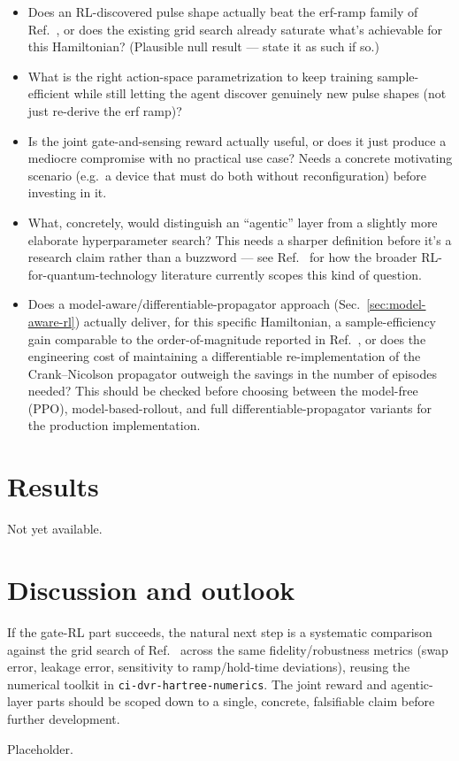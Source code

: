 \documentclass[aps,prapplied,reprint,superscriptaddress,longbibliography]{revtex4-2}
\begin{document}
\begin{itemize}
  \item Does an RL-discovered pulse shape actually beat the erf-ramp family of
  Ref.~\cite{leinonen2025}, or does the existing grid search already saturate what's achievable
  for this Hamiltonian? (Plausible null result — state it as such if so.)
  \item What is the right action-space parametrization to keep training sample-efficient while still
  letting the agent discover genuinely new pulse shapes (not just re-derive the erf ramp)?
  \item Is the joint gate-and-sensing reward actually useful, or does it just produce a mediocre
  compromise with no practical use case? Needs a concrete motivating scenario (e.g.\ a device that
  must do both without reconfiguration) before investing in it.
  \item What, concretely, would distinguish an ``agentic'' layer from a slightly more elaborate
  hyperparameter search? This needs a sharper definition before it's a research claim rather than a
  buzzword — see Ref.~\cite{bukov2026reinforcement} for how the broader RL-for-quantum-technology
  literature currently scopes this kind of question.
  \item Does a model-aware/differentiable-propagator approach (Sec.~\ref{sec:model-aware-rl}) actually
  deliver, for this specific Hamiltonian, a sample-efficiency gain comparable to the order-of-magnitude
  reported in Ref.~\cite{khalid2023samplemodelbased}, or does the engineering cost of maintaining a
  differentiable re-implementation of the Crank--Nicolson propagator outweigh the savings in the
  number of episodes needed? This should be checked before choosing between the model-free (PPO),
  model-based-rollout, and full differentiable-propagator variants for the production implementation.
\end{itemize}

\section{Results}

Not yet available.

\section{Discussion and outlook}

If the gate-RL part succeeds, the natural next step is a systematic comparison against the grid
search of Ref.~\cite{leinonen2025} across the same fidelity/robustness metrics (swap error, leakage
error, sensitivity to ramp/hold-time deviations), reusing the numerical toolkit in
\texttt{ci-dvr-hartree-numerics}. The joint reward and agentic-layer parts should be scoped down to
a single, concrete, falsifiable claim before further development.

\begin{acknowledgments}
Placeholder.
\end{acknowledgments}


\end{document}
